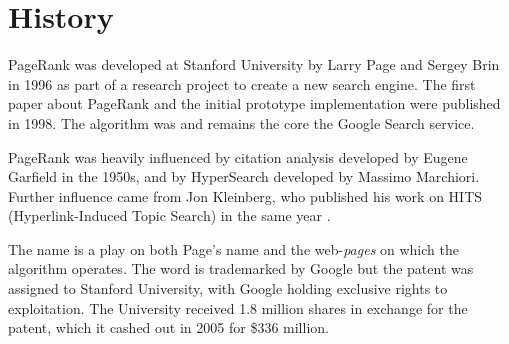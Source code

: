 \section{History}

PageRank was developed at Stanford University by Larry Page and Sergey Brin in 
1996 as part of a research project to create a new search engine. 
The first paper about PageRank and the initial prototype implementation were 
published in 1998. 
The algorithm was and remains the core the Google Search service.

PageRank was heavily influenced by citation analysis developed by Eugene 
Garfield in the 1950s, and by HyperSearch developed by Massimo Marchiori.
Further influence came from Jon Kleinberg, who published his 
work on HITS (Hyperlink-Induced Topic Search) in the same year \cite{pagerankwiki}.

The name is a play on both Page's name and the web-\emph{pages} on which
the algorithm operates.
The word is trademarked by Google but the patent was assigned to Stanford 
University, with Google holding exclusive rights to exploitation. 
The University received 1.8 million shares in exchange for the patent, which 
it cashed out in 2005 for \$336 million. 


